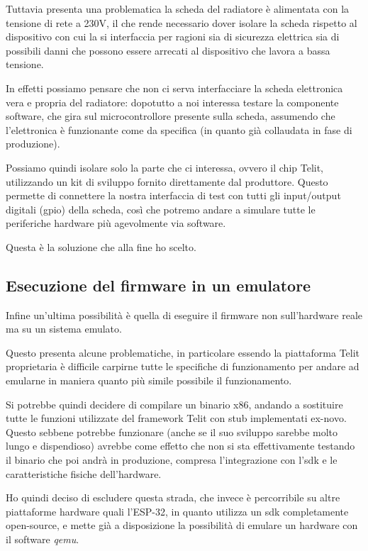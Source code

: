 \documentclass[12pt,a4paper,twoside,titlepage]{book}
\begin{document}
Tuttavia presenta una problematica la scheda del radiatore è alimentata con
la tensione di rete a 230V, il che rende necessario dover isolare la scheda rispetto
al dispositivo con cui la si interfaccia per ragioni sia di sicurezza elettrica sia
di possibili danni che possono essere arrecati al dispositivo che lavora a bassa tensione.

In effetti possiamo pensare che non ci serva interfacciare la scheda elettronica
vera e propria del radiatore: dopotutto a noi interessa testare la componente software,
che gira sul microcontrollore presente sulla scheda, assumendo che l'elettronica è
funzionante come da specifica (in quanto già collaudata in fase di produzione).

Possiamo quindi isolare solo la parte che ci interessa, ovvero il chip Telit, utilizzando
un kit di sviluppo fornito direttamente dal produttore. Questo permette di connettere
la nostra interfaccia di test con tutti gli input/output digitali (\Gls{gpio}) della scheda,
così che potremo andare a simulare tutte le periferiche hardware più agevolmente via software.

Questa è la soluzione che alla fine ho scelto.

\subsection{Esecuzione del firmware in un emulatore}

Infine un'ultima possibilità è quella di eseguire il \gls{firmware} non sull'hardware
reale ma su un sistema emulato.

Questo presenta alcune problematiche, in particolare essendo la piattaforma Telit
proprietaria è difficile carpirne tutte le specifiche di funzionamento per andare
ad emularne in maniera quanto più simile possibile il funzionamento.

Si potrebbe quindi decidere di compilare un binario x86, andando a sostituire tutte
le funzioni utilizzate del framework Telit con stub implementati ex-novo. Questo
sebbene potrebbe funzionare (anche se il suo sviluppo sarebbe molto lungo e dispendioso)
avrebbe come effetto che non si sta effettivamente testando il binario che poi andrà
in produzione, compresa l'integrazione con l'\acrshort{sdk} e le caratteristiche fisiche dell'hardware.

Ho quindi deciso di escludere questa strada, che invece è percorribile su altre
piattaforme hardware quali l'ESP-32, in quanto utilizza un \acrshort{sdk} completamente open-source,
e mette già a disposizione la possibilità di emulare un hardware con il software \textit{qemu}.
\end{document}
